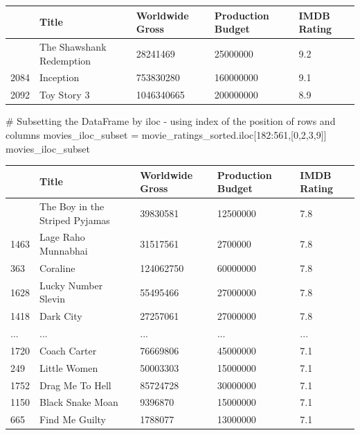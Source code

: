\documentclass[
  letterpaper,
  DIV=11,
  numbers=noendperiod]{scrreprt}
\newenvironment{Shaded}{\begin{snugshade}}{\end{snugshade}}
\newcommand{\CommentTok}[1]{\textcolor[rgb]{0.37,0.37,0.37}{#1}}
\newcommand{\DecValTok}[1]{\textcolor[rgb]{0.68,0.00,0.00}{#1}}
\newcommand{\NormalTok}[1]{\textcolor[rgb]{0.00,0.23,0.31}{#1}}
\newcommand{\OperatorTok}[1]{\textcolor[rgb]{0.37,0.37,0.37}{#1}}
\begin{document}
\begin{longtable}[]{@{}lllll@{}}
\toprule\noalign{}
& Title & Worldwide Gross & Production Budget & IMDB Rating \\
\midrule\noalign{}
\endhead
\bottomrule\noalign{}
\endlastfoot
182 & The Shawshank Redemption & 28241469 & 25000000 & 9.2 \\
2084 & Inception & 753830280 & 160000000 & 9.1 \\
2092 & Toy Story 3 & 1046340665 & 200000000 & 8.9 \\
\end{longtable}

\begin{Shaded}
\begin{Highlighting}[]
\CommentTok{\# Subsetting the DataFrame by iloc {-} using index of the position of rows and columns}
\NormalTok{movies\_iloc\_subset }\OperatorTok{=}\NormalTok{ movie\_ratings\_sorted.iloc[}\DecValTok{182}\NormalTok{:}\DecValTok{561}\NormalTok{,[}\DecValTok{0}\NormalTok{,}\DecValTok{2}\NormalTok{,}\DecValTok{3}\NormalTok{,}\DecValTok{9}\NormalTok{]]}
\NormalTok{movies\_iloc\_subset}
\end{Highlighting}
\end{Shaded}

\begin{longtable}[]{@{}lllll@{}}
\toprule\noalign{}
& Title & Worldwide Gross & Production Budget & IMDB Rating \\
\midrule\noalign{}
\endhead
\bottomrule\noalign{}
\endlastfoot
227 & The Boy in the Striped Pyjamas & 39830581 & 12500000 & 7.8 \\
1463 & Lage Raho Munnabhai & 31517561 & 2700000 & 7.8 \\
363 & Coraline & 124062750 & 60000000 & 7.8 \\
1628 & Lucky Number Slevin & 55495466 & 27000000 & 7.8 \\
1418 & Dark City & 27257061 & 27000000 & 7.8 \\
... & ... & ... & ... & ... \\
1720 & Coach Carter & 76669806 & 45000000 & 7.1 \\
249 & Little Women & 50003303 & 15000000 & 7.1 \\
1752 & Drag Me To Hell & 85724728 & 30000000 & 7.1 \\
1150 & Black Snake Moan & 9396870 & 15000000 & 7.1 \\
665 & Find Me Guilty & 1788077 & 13000000 & 7.1 \\
\end{longtable}
\end{document}
